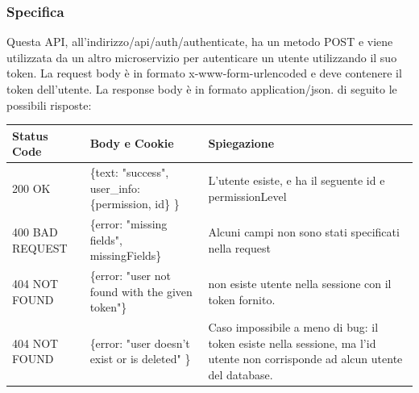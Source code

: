\documentclass{report}
\begin{document}
\subsubsection*{Specifica}
Questa API, all'indirizzo/api/auth/authenticate, ha un metodo POST e viene utilizzata da un altro microservizio per autenticare un utente utilizzando il suo token.
La request body è in formato x-www-form-urlencoded e deve contenere il token dell'utente.
La response body è in formato application/json. di seguito le possibili risposte:
\begin{center} %
	\centering
	\begin{tabular}{ |p{4cm}|p{5cm}|p{4cm}| }
		\hline
		\centering Status Code & \qquad\quad Body e Cookie & \qquad\qquad Spiegazione\\ %
		\hline
		200 OK & \{text: "success", user\_info: \{permission, id\} \} & L'utente esiste, e ha il seguente id e permissionLevel 	\\
		\hline
		400 BAD REQUEST & \{error: "missing fields", missingFields\} & Alcuni campi non sono stati specificati nella request\\ %
		\hline
		404 NOT FOUND & \{error: "user not found with the given token"\} & non esiste utente nella sessione con il token fornito.\\%
		\hline
		404 NOT FOUND & \{error: "user doesn't exist or is deleted" \} & Caso impossibile a meno di bug: il token esiste nella sessione, ma l'id utente non corrisponde ad alcun utente del database. \\
		\hline
		
	\end{tabular}
\end{center}
\end{document}
